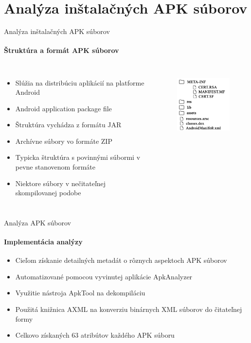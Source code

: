 \documentclass{beamer}
\begin{document}

\section{Analýza inštalačných APK súborov}
  \begin{frame}[label=lists]{Analýza inštalačných APK súborov}
   \framesubtitle{Štruktúra a formát APK súborov}
    \begin{columns}
       \begin{itemize}
		\item Slúžia na distribúciu aplikácií na platforme Android
		\item Android application package file	
		\item Štruktúra vychádza z formátu JAR
		\item Archívne súbory vo formáte ZIP
		\item Typicka štruktúra s povinnými súbormi v pevne stanovenom formáte
		\item Niektore súbory v nečitateľnej skompilovanej podobe
	\end{itemize}	  
        	 \begin{figure}[htb]
    \includegraphics[width=45mm]{images/apkStructure.pdf}
  \label{fig:strukturaApk}
\end{figure}
    \end{columns}
    
   \end{frame} 
    
  \begin{frame}[label=lists]{Analýza APK súborov}
  \framesubtitle{Implementácia analýzy}
	\begin{itemize}
		\item Cieľom získanie detailných metadát o rôznych aspektoch APK súborov
		\item Automatizované pomocou vyvinutej aplikácie ApkAnalyzer\cite{apkanalyzer}
		\item Využitie nástroja ApkTool na dekompiláciu \cite{apktool}
		\item Použitá knižnica AXML na konverziu binárnych XML súborov do čitateľnej formy 
		\item Celkovo získaných 63 atribútov každého APK súboru
	\end{itemize}	    
   \end{frame} 
   
\end{document}
